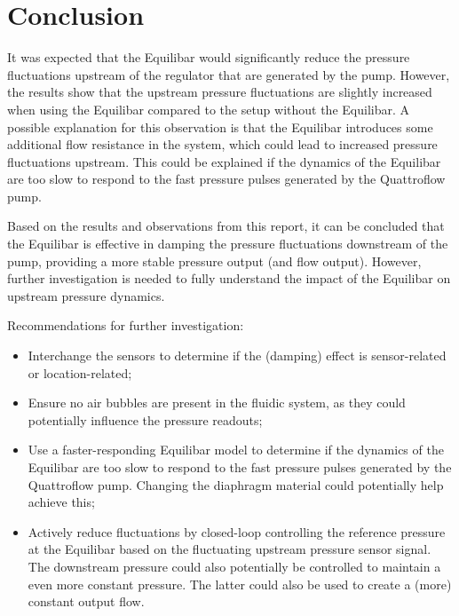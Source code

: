 \documentclass[12pt,a4paper]{article}
\begin{document}
\newpage
\section{Conclusion}
\label{sec:conclusion}
It was expected that the Equilibar would significantly reduce the pressure fluctuations upstream of the regulator that are generated by the pump. However, the results show that the upstream pressure fluctuations are slightly increased when using the Equilibar compared to the setup without the Equilibar. A possible explanation for this observation is that the Equilibar introduces some additional flow resistance in the system, which could lead to increased pressure fluctuations upstream. This could be explained if the dynamics of the Equilibar are too slow to respond to the fast pressure pulses generated by the Quattroflow pump. 

\bigskip

Based on the results and observations from this report, it can be concluded that the Equilibar is effective in damping the pressure fluctuations downstream of the pump, providing a more stable pressure output (and flow output). However, further investigation is needed to fully understand the impact of the Equilibar on upstream pressure dynamics.

\bigskip

Recommendations for further investigation:
\begin{itemize}
    \item Interchange the sensors to determine if the (damping) effect is sensor-related or location-related;
    \item Ensure no air bubbles are present in the fluidic system, as they could potentially influence the pressure readouts;
    \item Use a faster-responding Equilibar model to determine if the dynamics of the Equilibar are too slow to respond to the fast pressure pulses generated by the Quattroflow pump. Changing the diaphragm material could potentially help achieve this;
    \item Actively reduce fluctuations by closed-loop controlling the reference pressure at the Equilibar based on the fluctuating upstream pressure sensor signal. The downstream pressure could also potentially be controlled to maintain a even more constant pressure. The latter could also be used to create a (more) constant output flow.
\end{itemize}
\end{document}
